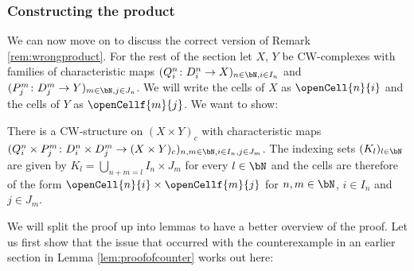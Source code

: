 \subsubsection*{Constructing the product}\label{sec:constructproduct}

We can now move on to discuss the correct version of Remark \ref{rem:wrongproduct}. 
For the rest of the section let $X$, $Y$ be CW-complexes with families of characteristic maps $(Q_i^n \colon D_i^n \to X)_{n \in \bN, i \in I_n}$ and $(P_j^m \colon D_j^m \to Y)_{m \in \bN, j \in J_n}$. We will write the cells of $X$ as $\openCell{n}{i}$ and the cells of $Y$ as $\openCellf{m}{j}$.
We want to show:

\begin{thm}\label{thm:productcw}
    There is a CW-structure on $(X \times Y)_c$ with characteristic maps $(Q_i^n \times P_j^m \colon D_i^n \times D_j^m \to (X \times Y)_c)_{n,m \in \bN,i \in I_n,j \in J_m}$.
    The indexing sets $(K_l)_{l \in \bN}$ are given by $K_l = \bigcup_{n + m = l}I_n \times J_m$ for every $l \in \bN$ and the cells are therefore of the form $\openCell{n}{i} \times \openCellf{m}{j}$ for $n, m \in \bN$, $i \in I_n$ and $j \in J_m$.
    \href{https://github.com/scholzhannah/CWComplexes/blob/7be4872a05b534011cc969eb5b80a4b7f0bf57e2/CWcomplexes/Product.lean#L226-L377}{\faExternalLink}
\end{thm}

We will split the proof up into lemmas to have a better overview of the proof. 
Let us first show that the issue that occurred with the counterexample in an earlier section in Lemma \ref{lem:proofofcounter} works out here:

